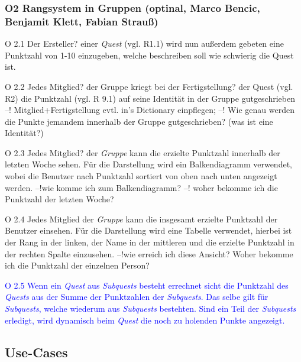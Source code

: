 \documentclass{article}
\begin{document}
\subsubsection{O2 Rangsystem in Gruppen (optinal, Marco Bencic, Benjamit Klett, Fabian Strauß)}
	\begin{itemize}
		\item{O 2.1} Der Ersteller? einer \textit{Quest} (vgl. R1.1) wird nun außerdem gebeten eine Punktzahl von 1-10 einzugeben, welche beschreiben soll wie schwierig die Quest ist.
		\item{O 2.2} Jedes Mitglied? der Gruppe kriegt bei der Fertigstellung? der Quest (vgl. R2) die Punktzahl (vgl. R 9.1) auf seine Identität in der Gruppe gutgeschrieben --! Mitglied+Fertigstellung evtl. in's Dictionary einpflegen; --! Wie genau werden die Punkte jemandem innerhalb der Gruppe gutgeschrieben? (was ist eine Identität?)
		\item{O 2.3} Jedes Mitglied? der \textit{Gruppe} kann die erzielte Punktzahl innerhalb der letzten Woche sehen. Für die Darstellung wird ein Balkendiagramm verwendet, wobei die Benutzer nach Punktzahl sortiert von oben nach unten angezeigt werden. --!wie komme ich zum Balkendiagramm? --! woher bekomme ich die Punktzahl der letzten Woche?
		\item{O 2.4} Jedes Mitglied der \textit{Gruppe} kann die insgesamt erzielte Punktzahl der Benutzer einsehen. Für die Darstellung wird eine Tabelle verwendet, hierbei ist der Rang in der linken, der Name in der mittleren und die erzielte Punktzahl in der rechten Spalte einzusehen. --!wie erreich ich diese Ansicht? Woher bekomme ich die Punktzahl der einzelnen Person?
		\textcolor{blue}{\item{O 2.5} Wenn ein \textit{Quest} aus \textit{Subquests} besteht errechnet sicht die Punktzahl des \textit{Quests} aus der Summe der Punktzahlen der \textit{Subquests}. Das selbe gilt für \textit{Subquests}, welche wiederum aus \textit{Subquests} bestehten. Sind ein Teil der \textit{Subquests} erledigt, wird dynamisch beim \textit{Quest} die noch zu holenden Punkte angezeigt.}
	\end{itemize}

\subsection{Use-Cases}
\end{document}
